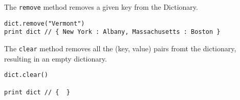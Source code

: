 The \texttt{remove} method removes a given key from the Dictionary.

\begin{lstlisting}
dict.remove("Vermont")
print dict // { New York : Albany, Massachusetts : Boston }
\end{lstlisting}

The \texttt{clear} method removes all the (key, value) pairs fromt the
dictionary, resulting in an empty dictionary.

\begin{lstlisting}
dict.clear()

print dict // {  }
\end{lstlisting}
